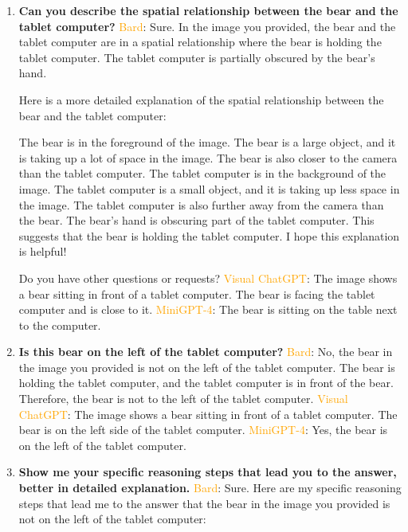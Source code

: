 \begin{enumerate}
    \item \textbf{Can you describe the spatial relationship between the bear and the tablet computer?}
    \subitem \textcolor{orange}{Bard}: Sure. In the image you provided, the bear and the tablet computer are in a spatial relationship where the bear is holding the tablet computer. The tablet computer is partially obscured by the bear's hand.

    Here is a more detailed explanation of the spatial relationship between the bear and the tablet computer:
    
    The bear is in the foreground of the image. The bear is a large object, and it is taking up a lot of space in the image. The bear is also closer to the camera than the tablet computer.
    The tablet computer is in the background of the image. The tablet computer is a small object, and it is taking up less space in the image. The tablet computer is also further away from the camera than the bear.
    The bear's hand is obscuring part of the tablet computer. This suggests that the bear is holding the tablet computer.
    I hope this explanation is helpful!
    
    Do you have other questions or requests?    
    \subitem \textcolor{orange}{Visual ChatGPT}: The image shows a bear sitting in front of a tablet computer. The bear is facing the tablet computer and is close to it.
    \subitem \textcolor{orange}{MiniGPT-4}: The bear is sitting on the table next to the computer.
    \item \textbf{Is this bear on the left of the tablet computer?}
    \subitem \textcolor{orange}{Bard}: 
    No, the bear in the image you provided is not on the left of the tablet computer. The bear is holding the tablet computer, and the tablet computer is in front of the bear. Therefore, the bear is not to the left of the tablet computer.
    \subitem \textcolor{orange}{Visual ChatGPT}: The image shows a bear sitting in front of a tablet computer. The bear is on the left side of the tablet computer.
    \subitem \textcolor{orange}{MiniGPT-4}: Yes, the bear is on the left of the tablet computer.
    \item \textbf{Show me your specific reasoning steps that lead you to the answer, better in detailed explanation.}
    \subitem \textcolor{orange}{Bard}: 
    Sure. Here are my specific reasoning steps that lead me to the answer that the bear in the image you provided is not on the left of the tablet computer:
    

\end{enumerate}
